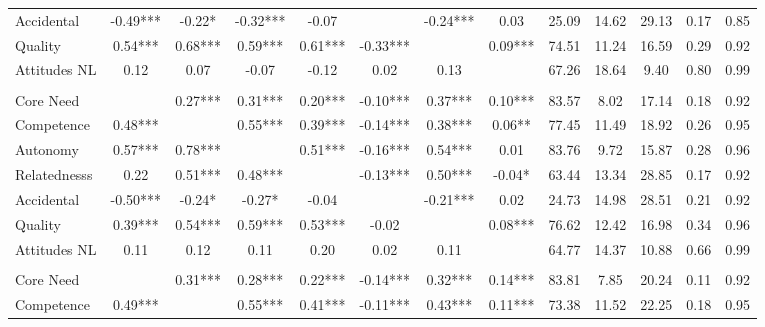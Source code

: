 \begin{table}
\begin{minipage}[t][\textheight][t]{\textwidth}
{\begin{tabular}[t]{lcccccccccccc}
\hspace{1em}Accidental & -0.49*** & -0.22* & -0.32*** & -0.07 &  & -0.24*** & 0.03 & 25.09 & 14.62 & 29.13 & 0.17 & 0.85\\
\hspace{1em}Quality & 0.54*** & 0.68*** & 0.59*** & 0.61*** & -0.33*** &  & 0.09*** & 74.51 & 11.24 & 16.59 & 0.29 & 0.92\\
\hspace{1em}Attitudes NL & 0.12 & 0.07 & -0.07 & -0.12 & 0.02 & 0.13 &  & 67.26 & 18.64 & 9.40 & 0.80 & 0.99\\
\addlinespace[0.3em]
\multicolumn{13}{l}{\textbf{Study 3}}\\
\hspace{1em}Core Need &  & 0.27*** & 0.31*** & 0.20*** & -0.10*** & 0.37*** & 0.10*** & 83.57 & 8.02 & 17.14 & 0.18 & 0.92\\
\hspace{1em}Competence & 0.48*** &  & 0.55*** & 0.39*** & -0.14*** & 0.38*** & 0.06** & 77.45 & 11.49 & 18.92 & 0.26 & 0.95\\
\hspace{1em}Autonomy & 0.57*** & 0.78*** &  & 0.51*** & -0.16*** & 0.54*** & 0.01 & 83.76 & 9.72 & 15.87 & 0.28 & 0.96\\
\hspace{1em}Relatednesss & 0.22 & 0.51*** & 0.48*** &  & -0.13*** & 0.50*** & -0.04* & 63.44 & 13.34 & 28.85 & 0.17 & 0.92\\
\hspace{1em}Accidental & -0.50*** & -0.24* & -0.27* & -0.04 &  & -0.21*** & 0.02 & 24.73 & 14.98 & 28.51 & 0.21 & 0.92\\
\hspace{1em}Quality & 0.39*** & 0.54*** & 0.59*** & 0.53*** & -0.02 &  & 0.08*** & 76.62 & 12.42 & 16.98 & 0.34 & 0.96\\
\hspace{1em}Attitudes NL & 0.11 & 0.12 & 0.11 & 0.20 & 0.02 & 0.11 &  & 64.77 & 14.37 & 10.88 & 0.66 & 0.99\\
\addlinespace[0.3em]
\multicolumn{13}{l}{\textbf{Across Studies}}\\
\hspace{1em}Core Need &  & 0.31*** & 0.28*** & 0.22*** & -0.14*** & 0.32*** & 0.14*** & 83.81 & 7.85 & 20.24 & 0.11 & 0.92\\
\hspace{1em}Competence & 0.49*** &  & 0.55*** & 0.41*** & -0.11*** & 0.43*** & 0.11*** & 73.38 & 11.52 & 22.25 & 0.18 & 0.95\\

\end{tabular}}
\end{minipage}
\end{table}
